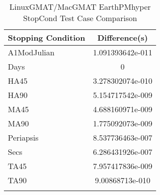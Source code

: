 \begin{table}[htbp!]
\centering
\caption{ LinuxGMAT/MacGMAT EarthPMhyper StopCond Test Case Comparison}
      \begin{tabular}{lc}
      \hline\hline
          Stopping Condition & Difference(s) \\
         \hline
         A1ModJulian & 1.091393642e-011 \\
         Days & 0 \\
         HA45 & 3.278302074e-010 \\
         HA90 & 5.154717542e-009 \\
         MA45 & 4.688160971e-009 \\
         MA90 & 1.775092073e-009 \\
         Periapsis & 8.537736463e-007 \\
         Secs & 6.286431926e-007 \\
         TA45 & 7.957417836e-009 \\
         TA90 & 9.00868713e-010 \\
      \hline\hline
      \label{Table: LinuxGMAT-MacGMAT EarthPMhyper StopCond Table} 
\end{tabular}
\end{table}
